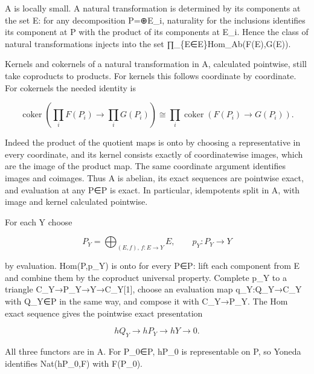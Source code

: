 A is locally small. A natural transformation is determined by its components at the set E:\allowbreak{} for any decomposition P\allowbreak{}=\allowbreak{}⊕E\_\allowbreak{}i,\allowbreak{} naturality for the inclusions identifies its component at P with the product of its components at E\_\allowbreak{}i. Hence the class of natural transformations injects into the set ∏\_\allowbreak{}\{E\allowbreak{}∈E\}Hom\_\allowbreak{}Ab(F(E)\allowbreak{},\allowbreak{}G(E)\allowbreak{})\allowbreak{}.

Kernels and cokernels of a natural transformation in A,\allowbreak{} calculated pointwise,\allowbreak{} still take coproducts to products. For kernels this follows coordinate by coordinate. For cokernels the needed identity is

\[
 \operatorname{coker}\left(\prod_i F(P_i)\to\prod_i G(P_i)\right)
   \cong\prod_i\operatorname{coker}(F(P_i)\to G(P_i)).
\]

Indeed the product of the quotient maps is onto by choosing a representative in every coordinate,\allowbreak{} and its kernel consists exactly of coordinatewise images,\allowbreak{} which are the image of the product map. The same coordinate argument identifies images and coimages. Thus A is abelian,\allowbreak{} its exact sequences are pointwise exact,\allowbreak{} and evaluation at any P\allowbreak{}∈P is exact. In particular,\allowbreak{} idempotents split in A,\allowbreak{} with image and kernel calculated pointwise.

For each Y choose

\[
 P_Y=\bigoplus_{(E,f),\,f:E\to Y}E,\qquad p_Y:P_Y\to Y
\]

by evaluation. Hom(P,\allowbreak{}p\_\allowbreak{}Y)\allowbreak{} is onto for every P\allowbreak{}∈P:\allowbreak{} lift each component from E and combine them by the coproduct universal property. Complete p\_\allowbreak{}Y to a triangle C\_\allowbreak{}Y\allowbreak{}→P\_\allowbreak{}Y\allowbreak{}→Y\allowbreak{}→C\_\allowbreak{}Y[1]\allowbreak{},\allowbreak{} choose an evaluation map q\_\allowbreak{}Y:\allowbreak{}Q\_\allowbreak{}Y\allowbreak{}→C\_\allowbreak{}Y with Q\_\allowbreak{}Y\allowbreak{}∈P in the same way,\allowbreak{} and compose it with C\_\allowbreak{}Y\allowbreak{}→P\_\allowbreak{}Y. The Hom exact sequence gives the pointwise exact presentation

\[
 hQ_Y\longrightarrow hP_Y\longrightarrow hY\longrightarrow0. \tag{2.1}
\]

All three functors are in A. For P\_\allowbreak{}0\allowbreak{}∈P,\allowbreak{} hP\_\allowbreak{}0 is representable on P,\allowbreak{} so Yoneda identifies Nat(hP\_\allowbreak{}0,\allowbreak{}F)\allowbreak{} with F(P\_\allowbreak{}0)\allowbreak{}.

